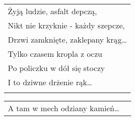 \documentclass[a5paper]{article}
\begin{document}
\noindent
\begin{tabular}{@{}p{9.5cm}@{}}
Żyją ludzie, asfalt depczą, \\
Nikt nie krzyknie - każdy szepcze, \\
Drzwi zamknięte, zaklepany krąg… \\
Tylko czasem kropla z oczu \\
Po policzku w dół się stoczy \\
I to dziwne drżenie rąk… \\ \\
\end{tabular}

\noindent
\begin{tabular}{@{}p{8.5cm}p{3cm}@{}}
A tam w mech odziany kamień…
\end{tabular}
\end{document}

